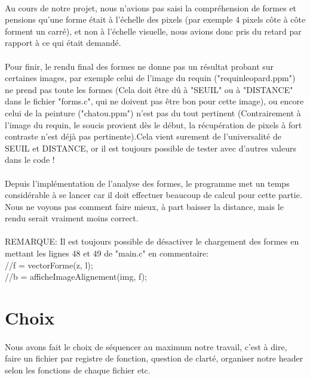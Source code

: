 \documentclass[a4paper , 10pt]{article}
\begin{document}
\paragraph{}
Au cours de notre projet, nous n'avions pas saisi la compréhension de formes et pensions qu'une forme était à l'échelle des pixels (par exemple 4 pixels côte à côte forment un carré), et non à l’échelle visuelle, nous avions donc pris du retard par rapport à ce qui était demandé.
\paragraph{}
\newpage
Pour finir, le rendu final des formes ne donne pas un résultat probant sur certaines images, par exemple celui de l'image du requin ("requinleopard.ppm") ne prend pas toute les formes (Cela doit être dû à "SEUIL" ou à "DISTANCE" dans le fichier "forms.c", qui ne doivent pas être bon pour cette image), ou encore celui de la peinture ("chatou.ppm") n'est pas du tout pertinent (Contrairement à l'image du requin, le soucis provient dès le début, la récupération de pixels à fort contraste n'est déjà pas pertinente).Cela vient surement de l'universalité de SEUIL et DISTANCE, or il est toujours possible de tester avec d'autres valeurs dans le code !
\paragraph{}
Depuis l'implémentation de l'analyse des formes, le programme met un temps considérable à se lancer car il doit effectuer beaucoup de calcul pour cette partie. Nous ne voyons pas comment faire mieux, à part baisser la distance, mais le rendu serait vraiment moins correct.\\
\\
REMARQUE: Il est toujours possible de désactiver le chargement des formes en mettant les lignes 48 et 49 de "main.c" en commentaire:\\
		//f = vectorForme(z, l);\\
    	//b = afficheImageAlignement(img, f);

\section{Choix}
\paragraph{}
Nous avons fait le choix de séquencer au maximum notre travail, c'est à dire, faire un fichier par registre de fonction, question de clarté, organiser notre header selon les fonctions de chaque fichier etc.
\end{document}
